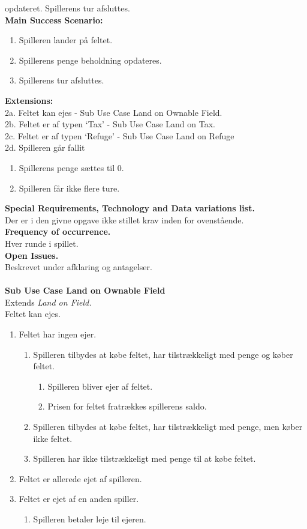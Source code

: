 opdateret. Spillerens tur afsluttes.\\
\textbf{Main Success Scenario:}
\begin{enumerate}
  \item Spilleren lander på feltet.
  \item Spillerens penge beholdning opdateres.
  \item Spillerens tur afsluttes.
\end{enumerate} 
\textbf{Extensions:}\\
2a. Feltet kan ejes - Sub Use Case Land on Ownable Field.\\
2b. Feltet er af typen ‘Tax’ - Sub Use Case Land on Tax.\\
2c. Feltet er af typen ‘Refuge’ - Sub Use Case Land on Refuge\\
2d. Spilleren går fallit
\begin{enumerate}
  \item Spillerens penge sættes til 0.
  \item Spilleren får ikke flere ture.
\end{enumerate}
\textbf{Special Requirements, Technology and Data variations list.}\\
Der er i den givne opgave ikke stillet krav inden for ovenstående.\\
\textbf{Frequency of occurrence.}\\
Hver runde i spillet.\\
\textbf{Open Issues.}\\
Beskrevet under afklaring og antagelser.\\
\\
\textbf{\large Sub Use Case Land on Ownable Field}\\
Extends \emph{Land on Field.}\\
Feltet kan ejes.
\begin{enumerate}
  \item Feltet har ingen ejer.
  \begin{enumerate}
    \item Spilleren tilbydes at købe feltet, har tilstrækkeligt med penge og
    køber feltet.
    \begin{enumerate}
      \item Spilleren bliver ejer af feltet.
      \item Prisen for feltet fratrækkes spillerens saldo.
    \end{enumerate}
    \item Spilleren tilbydes at købe feltet, har tilstrækkeligt med penge, men
    køber ikke feltet.
    \item Spilleren har ikke tilstrækkeligt med penge til at købe feltet.
  \end{enumerate}  
  \item Feltet er allerede ejet af spilleren.
  \item Feltet er ejet af en anden spiller.
  \begin{enumerate}
    \item Spilleren betaler leje til ejeren.
  \end{enumerate}
\end{enumerate}
